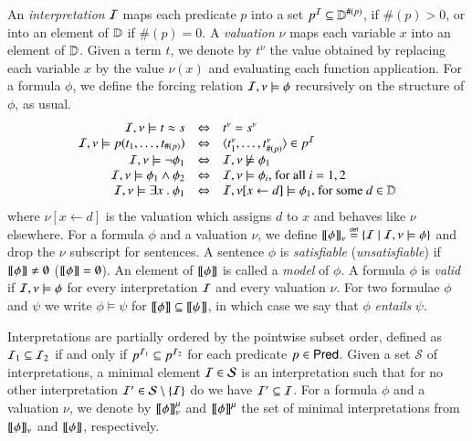 
An \emph{interpretation} $\mathcal{I}$ maps each predicate $p$ into a set $p^{\mathcal{I}}
\subseteq \mathbb{D}^{\#(p)}$, if $\#(p)>0$, or into an element of $\mathbb{D}$
if $\#(p)=0$. A \emph{valuation} $\nu$ maps each variable $x$ into an
element of $\mathbb{D}$. Given a term $t$, we denote by $t^\nu$ the value
obtained by replacing each variable $x$ by the value $\nu(x)$ and
evaluating each function application. For a formula $\phi$, we define
the forcing relation $\mathcal{I},\nu \models \phi$ recursively on the
structure of $\phi$, as usual. 
\ifLongVersion
\[
\begin{array}{rcl}
\mathcal{I},\nu \models t \approx s & \Leftrightarrow & t^\nu=s^\nu \\
\mathcal{I},\nu \models p(t_1,\ldots,t_{\#(p)}) & \Leftrightarrow & \langle t_1^\nu,\ldots,t_{\#(p)}^\nu \rangle \in p^{\mathcal{I}} \\
\mathcal{I},\nu \models \neg\phi_1 & \Leftrightarrow & \mathcal{I},\nu \not\models \phi_1 \\
\mathcal{I},\nu \models \phi_1 \wedge \phi_2 & \Leftrightarrow & \mathcal{I},\nu \models \phi_i \text{, for all } i=1,2 \\ 
\mathcal{I},\nu \models \exists x ~.~ \phi_1 & \Leftrightarrow & \mathcal{I},\nu[x\leftarrow d] \models \phi_1 \text{, for some } d \in \mathbb{D} 
\end{array}
\]
where $\nu[x\leftarrow d]$ is the valuation which assigns $d$ to $x$
and behaves like $\nu$ elsewhere.  
\fi 
For a formula $\phi$ and a valuation $\nu$, we define ${\bf [\![} \phi {\bf ]\!]}_\nu
\stackrel{\scriptscriptstyle{\mathsf{def}}}{=} \{ \mathcal{I} \mid \mathcal{I},\nu \models \phi \}$ and drop the $\nu$ subscript
for sentences. A sentence $\phi$ is \emph{satisfiable}
(\emph{unsatisfiable}) if ${\bf [\![} \phi {\bf ]\!]}\neq\emptyset$
(${\bf [\![} \phi {\bf ]\!]}=\emptyset$). An element of ${\bf [\![} \phi {\bf ]\!]}$ is called a
\emph{model} of $\phi$. A formula $\phi$ is \emph{valid} if $\mathcal{I},\nu
\models \phi$ for every interpretation $\mathcal{I}$ and every valuation
$\nu$. For two formulae $\phi$ and $\psi$ we write $\phi \models \psi$
for ${\bf [\![} \phi {\bf ]\!]} \subseteq {\bf [\![} \psi {\bf ]\!]}$, in which case we say that
$\phi$ \emph{entails} $\psi$.

Interpretations are partially ordered by the pointwise subset order,
defined as $\mathcal{I}_1 \subseteq \mathcal{I}_2$ if and only if $p^{\mathcal{I}_1} \subseteq
p^{\mathcal{I}_2}$ for each predicate $p \in \mathsf{Pred}$. Given a set $\mathcal{S}$
of interpretations, a minimal element $\mathcal{I} \in \mathcal{S}$ is an
interpretation such that for no other interpretation $\mathcal{I}' \in
\mathcal{S} \setminus \{ \mathcal{I} \}$ do we have $\mathcal{I}' \subseteq \mathcal{I}$. For a
formula $\phi$ and a valuation $\nu$, we denote by ${\bf [\![} \phi {\bf ]\!]}^\mu_\nu$
and ${\bf [\![} \phi {\bf ]\!]}^\mu$ the set of minimal interpretations from
${\bf [\![} \phi {\bf ]\!]}_\nu$ and ${\bf [\![} \phi {\bf ]\!]}$, respectively.


